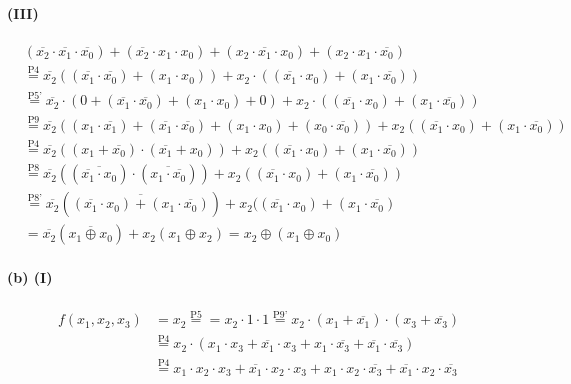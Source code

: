 \documentclass[a4paper]{article}
\begin{document}
\paragraph{(III)}
\begin{align*}
	&(\overline{x_2}\cdot\overline{x_1}\cdot\overline{x_0})+(\overline{x_2}\cdot x_1 \cdot x_0) +(x_2\cdot\overline{x_1}\cdot x_0)+(x_2\cdot x_1 \cdot\overline{x_0})\\
	&\stackrel{\text{P4}}{=} \overline{x_2}((\overline{x_1}\cdot\overline{x_0})+(x_1\cdot x_0)) + x_2\cdot((\overline{x_1}\cdot x_0)+(x_1\cdot\overline{x_0}))\\
	&\stackrel{\text{P5'}}{=}\overline{x_2}\cdot(0+(\overline{x_1}\cdot\overline{x_0})+(x_1\cdot x_0)+0) + x_2\cdot((\overline{x_1}\cdot x_0)+(x_1\cdot\overline{x_0}))\\
	&\stackrel{\text{P9}}{=} \overline{x_2}((x_1\cdot\overline{x_1})+(\overline{x_1}\cdot\overline{x_0})+(x_1\cdot x_0)+(x_0\cdot\overline{x_0})) + x_2((\overline{x_1}\cdot x_0)+(x_1\cdot\overline{x_0}))\\
	&\stackrel{\text{P4}}{=} \overline{x_2}((x_1+\overline{x_0})\cdot(\overline{x_1}+x_0))+x_2((\overline{x_1}\cdot x_0)+(x_1\cdot\overline{x_0}))\\
	&\stackrel{\text{P8}}{=} \overline{x_2}((\overline{\overline{x_1}\cdot x_0})\cdot(\overline{x_1\cdot\overline{x_0}})) + x_2((\overline{x_1}\cdot x_0)+(x_1\cdot\overline{x_0}))\\
	&\stackrel{\text{P8'}}{=} \overline{x_2}(\overline{(\overline{x_1}\cdot x_0)+(x_1\cdot\overline{x_0})}) + x_2((\overline{x_1}\cdot x_0)+(x_1\cdot\overline{x_0})\\
	&= \overline{x_2}(\overline{x_1\oplus x_0}) + x_2(x_1\oplus x_2) = x_2\oplus(x_1\oplus x_0)
\end{align*}

\paragraph{(b) (I)}
\begin{align*}
	f(x_1,x_2,x_3) &= x_2 \stackrel{\text{P5}}{=} = x_2 \cdot 1\cdot 1 \stackrel{\text{P9'}}{=} x_2\cdot(x_1+\overline{x_1})\cdot(x_3+\overline{x_3})\\
				   &\stackrel{\text{P4}}{=} x_2\cdot(x_1\cdot x_3+\overline{x_1}\cdot x_3 + x_1\cdot\overline{x_3} + \overline{x_1}\cdot\overline{x_3})\\
				   &\stackrel{\text{P4}}{=} x_1\cdot x_2\cdot x_3 + \overline{x_1}\cdot x_2\cdot x_3 + x_1\cdot x_2\cdot\overline{x_3} + \overline{x_1}\cdot x_2\cdot\overline{x_3}
\end{align*}
\end{document}
